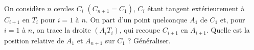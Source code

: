 On considère $n$ cercles $C_i$ $(C_{n+1} = C_1)$, $C_i$ étant tangent extérieurement à $C_{i+1}$ en $T_i$ pour $i = 1$ à $n$. On part d'un point quelconque $A_1$ de $C_1$ et, pour $i = 1$ à $n$, on trace la droite $(A_iT_i)$, qui recoupe $C_{i+1}$ en $A_{i+1}$. Quelle est la position relative de $A_1$ et $A_{n+1}$ sur $C_1$ ? Généraliser.

